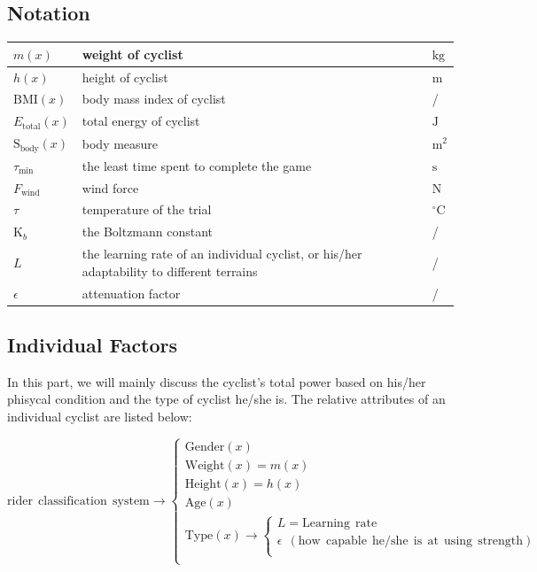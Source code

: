 \documentclass{article}
\begin{document}
		\subsection{Notation}
			\begin{tabular}{|l|l|l|}
				\hline
				$m( x )$&weight of cyclist&$\mathrm{kg}$\\
				\hline
				$ h ( x )$&height of cyclist&$\mathrm{m}$\\
				\hline
				$\mathrm{BMI}( x )$&body mass index of cyclist&/\\
				\hline
				$ E _\mathrm{total} ( x )$&total energy of cyclist&$\mathrm{J}$\\
				\hline
				$\mathrm{S}_\mathrm{body}( x )$&body measure&$\mathrm{m}^2$\\
				\hline
				$\tau_{\mathrm{min}}$&the least time spent to complete the game&$\mathrm{s}$\\
				\hline
				$F_\mathrm{wind}$&wind force&$\mathrm{N}$\\
				\hline
				$\tau$&temperature of the trial&$^\circ\mathrm{C}$\\
				\hline
				$\mathrm{K}_ b $&the Boltzmann constant&/\\
				\hline
				\(L\) & the learning rate of an individual cyclist, or his/her adaptability to different terrains & /\\
				\hline
				\(\epsilon\) & attenuation factor & /\\
				\hline
			\end{tabular}
		\subsection{Individual Factors}
			In this part, we will mainly discuss the cyclist's total power based on his/her phisycal condition and the type of cyclist he/she is. The relative attributes of an individual cyclist are listed below:

			\[\boxed{\mathrm{rider\:\:classification\:\:system}} \rightarrow \begin{cases}
				\mathrm{Gender}\left( x \right)\\
				\mathrm{Weight}\left( x \right)=m(x)\\
				\mathrm{Height}\left( x \right)=h(x)\\
				\mathrm{Age}\left( x \right)\\
				\mathrm{Type}\left( x \right) \rightarrow \begin{cases}
				L=\mathrm{Learning}\:\:\mathrm{rate}\\
				\epsilon\:\:(\mathrm{how\:\:capable\:\:he/she\:\:is\:\:at\:\:using\:\:strength})\\
			\end{cases}\\
			\end{cases}\]
\end{document}
